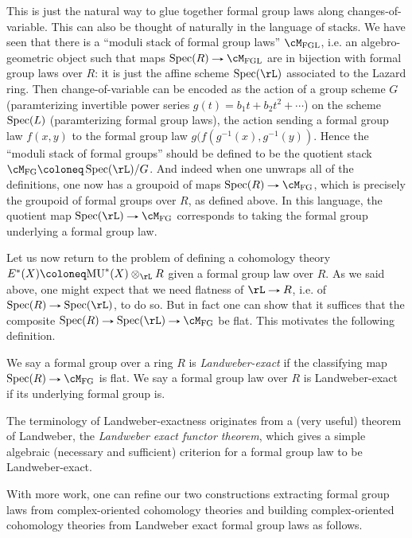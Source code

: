 This is just the natural way to glue together formal group laws along
changes-of-variable. This can also be thought of naturally in the
language of stacks. We have seen that there is a ``moduli stack of
formal group laws'' $\cM_\FGL$, i.e. an algebro-geometric object such
that maps $\Spec(R) \to \cM_\FGL$ are in bijection with formal group
laws over $R$: it is just the affine scheme $\Spec(\rL)$ associated to
the Lazard ring. Then change-of-variable can be encoded as the action
of a group scheme $G$ (paramterizing invertible power series
$g(t) = b_1t + b_2t^2 + \cdots$) on the scheme $\operatorname{Spec}(L)$
(paramterizing formal group laws), the action sending a formal group
law $f(x,y)$ to the formal group law $g(f(g^{-1}(x),g^{-1}(y))$. Hence
the ``moduli stack of formal groups'' should be defined to be the
quotient stack $\cM_{\FG} \ce \Spec(\rL) / G$. And indeed when one
unwraps all of the definitions, one now has a groupoid of maps
$\Spec(R) \to \cM_\FG$, which is precisely the groupoid of formal
groups over $R$, as defined above. In this language, the quotient map
$\Spec(\rL) \to \cM_\FG$ corresponds to taking the formal group
underlying a formal group law.

Let us now return to the problem of defining a cohomology theory
$E^*(X) \ce \MU^*(X) \otimes_\rL R$ given a formal group law over
$R$. As we said above, one might expect that we need flatness of
$\rL \to R$, i.e. of $\Spec(R) \to \Spec(\rL)$, to do so. But in fact
one can show that it suffices that the composite
$\Spec(R) \to \Spec(\rL) \to \cM_\FG$ be flat. This motivates the
following definition.

\begin{definition}
  \label{chrom-landexact}
  We say a formal group over a ring $R$ is \emph{Landweber-exact} if
  the classifying map $\Spec(R) \to \cM_\FG$ is flat. We say a formal
  group law over $R$ is Landweber-exact if its underlying formal group
  is.
\end{definition}

\begin{remark}
  \label{chrom-left}
  The terminology of Landweber-exactness originates from a (very
  useful) theorem of Landweber, the \emph{Landweber exact functor
    theorem}, which gives a simple algebraic (necessary and
  sufficient) criterion for a formal group law to be Landweber-exact.
\end{remark}

With more work, one can refine our two constructions extracting formal
group laws from complex-oriented cohomology theories and building
complex-oriented cohomology theories from Landweber exact formal group
laws as follows.

